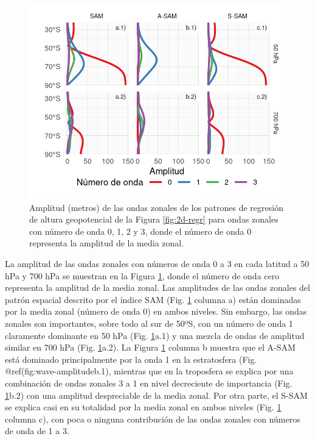 \documentclass[12pt,oneside]{reedthesis}
\begin{document}
\begin{figure}
\includegraphics{figures/30-sam/wave-amplitude-1} \caption{Amplitud (metros) de las ondas zonales de los patrones de regresión de altura geopotencial de la Figura \ref{fig:2d-regr} para ondas zonales con número de onda 0, 1, 2 y 3, donde el número de onda 0 representa la amplitud de la media zonal.}\label{fig:wave-amplitude}
\end{figure}

La amplitud de las ondas zonales con números de onda 0 a 3 en cada latitud a 50 hPa y 700 hPa se muestran en la Figura \ref{fig:wave-amplitude}, donde el número de onda cero representa la amplitud de la media zonal.
Las amplitudes de las ondas zonales del patrón espacial descrito por el índice SAM (Fig. \ref{fig:wave-amplitude} columna a) están dominadas por la media zonal (número de onda 0) en ambos niveles.
Sin embargo, las ondas zonales son importantes, sobre todo al sur de 50ºS, con un número de onda 1 claramente dominante en 50 hPa (Fig. \ref{fig:wave-amplitude}a.1) y una mezcla de ondas de amplitud similar en 700 hPa (Fig. \ref{fig:wave-amplitude}a.2).
La Figura \ref{fig:wave-amplitude} columna b muestra que el A-SAM está dominado principalmente por la onda 1 en la estratosfera (Fig. @ref(fig:wave-amplitudeb.1), mientras que en la troposfera se explica por una combinación de ondas zonales 3 a 1 en nivel decreciente de importancia (Fig. \ref{fig:wave-amplitude}b.2) con una amplitud despreciable de la media zonal.
Por otra parte, el S-SAM se explica casi en su totalidad por la media zonal en ambos niveles (Fig. \ref{fig:wave-amplitude} columna c), con poca o ninguna contribución de las ondas zonales con números de onda de 1 a 3.
\end{document}
